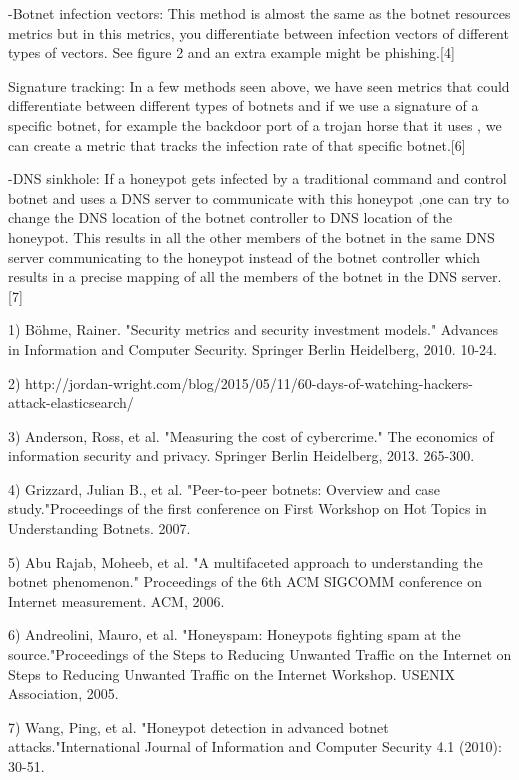 \documentclass[a4paper]{article}
\begin{document}
-Botnet infection vectors:
This method is almost the same as the botnet resources metrics but in this metrics, you differentiate between  infection vectors of different types of vectors. See figure 2 and an extra example might be phishing.[4]


Signature tracking:
In a few methods seen above, we have seen metrics that could differentiate between different types of botnets and if we use a signature of a specific botnet, for example the backdoor port of a trojan horse that it uses , we can create a metric that tracks the infection rate of that specific botnet.[6]

-DNS sinkhole:
If a honeypot gets infected by a traditional command and control botnet  and uses a DNS server to communicate with this honeypot ,one can try to change the DNS location of the botnet controller to DNS location of the honeypot. This results in all the other members of the botnet in the same DNS server communicating to the honeypot instead of the botnet controller which results in a precise mapping of all the members of the botnet in the DNS server.[7]



1) Böhme, Rainer. "Security metrics and security investment models." Advances in Information and Computer Security. Springer Berlin Heidelberg, 2010. 10-24.

2) http://jordan-wright.com/blog/2015/05/11/60-days-of-watching-hackers-attack-elasticsearch/

3) Anderson, Ross, et al. "Measuring the cost of cybercrime." The economics of information security and privacy. Springer Berlin Heidelberg, 2013. 265-300.

4) Grizzard, Julian B., et al. "Peer-to-peer botnets: Overview and case study."Proceedings of the first conference on First Workshop on Hot Topics in Understanding Botnets. 2007.

5) Abu Rajab, Moheeb, et al. "A multifaceted approach to understanding the botnet phenomenon." Proceedings of the 6th ACM SIGCOMM conference on Internet measurement. ACM, 2006.

6) Andreolini, Mauro, et al. "Honeyspam: Honeypots fighting spam at the source."Proceedings of the Steps to Reducing Unwanted Traffic on the Internet on Steps to Reducing Unwanted Traffic on the Internet Workshop. USENIX Association, 2005.

7) Wang, Ping, et al. "Honeypot detection in advanced botnet attacks."International Journal of Information and Computer Security 4.1 (2010): 30-51.
\end{document}
